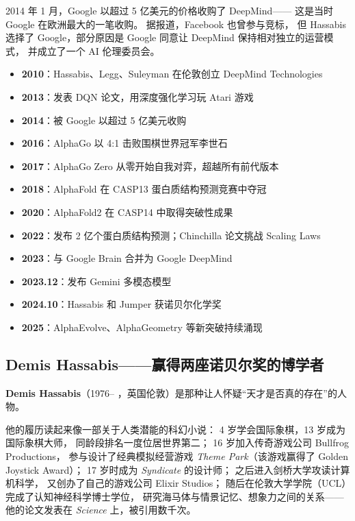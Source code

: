 2014 年 1 月，Google 以超过 5 亿美元的价格收购了 DeepMind——
这是当时 Google 在欧洲最大的一笔收购。
据报道，Facebook 也曾参与竞标，
但 Hassabis 选择了 Google，部分原因是 Google 同意让 DeepMind 保持相对独立的运营模式，
并成立了一个 AI 伦理委员会。

\begin{corebox}
\begin{itemize}[noitemsep]
  \item \textbf{2010}：Hassabis、Legg、Suleyman 在伦敦创立 DeepMind Technologies
  \item \textbf{2013}：发表 DQN 论文，用深度强化学习玩 Atari 游戏
  \item \textbf{2014}：被 Google 以超过 5 亿美元收购
  \item \textbf{2016}：AlphaGo 以 4:1 击败围棋世界冠军李世石
  \item \textbf{2017}：AlphaGo Zero 从零开始自我对弈，超越所有前代版本
  \item \textbf{2018}：AlphaFold 在 CASP13 蛋白质结构预测竞赛中夺冠
  \item \textbf{2020}：AlphaFold2 在 CASP14 中取得突破性成果
  \item \textbf{2022}：发布 2 亿个蛋白质结构预测；Chinchilla 论文挑战 Scaling Laws
  \item \textbf{2023}：与 Google Brain 合并为 Google DeepMind
  \item \textbf{2023.12}：发布 Gemini 多模态模型
  \item \textbf{2024.10}：Hassabis 和 Jumper 获诺贝尔化学奖
  \item \textbf{2025}：AlphaEvolve、AlphaGeometry 等新突破持续涌现
\end{itemize}
\end{corebox}


\subsection{Demis Hassabis——赢得两座诺贝尔奖的博学者}
\label{subsec:hassabis}

\noindent\textbf{Demis Hassabis}（1976-- ，英国伦敦）是那种让人怀疑``天才是否真的存在''的人物。

他的履历读起来像一部关于人类潜能的科幻小说：
4 岁学会国际象棋，13 岁成为国际象棋大师，
同龄段排名一度位居世界第二；
16 岁加入传奇游戏公司 Bullfrog Productions，
参与设计了经典模拟经营游戏 \textit{Theme Park}（该游戏赢得了 Golden Joystick Award）；
17 岁时成为 \textit{Syndicate} 的设计师；
之后进入剑桥大学攻读计算机科学，
又创办了自己的游戏公司 Elixir Studios；
随后在伦敦大学学院（UCL）完成了认知神经科学博士学位，
研究海马体与情景记忆、想象力之间的关系——
他的论文发表在 \textit{Science} 上，被引用数千次。

